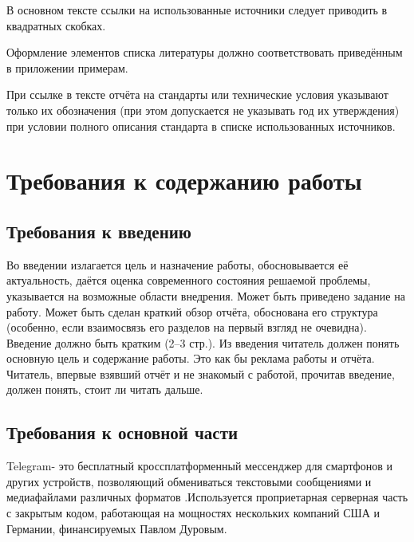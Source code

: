 \documentclass[utf8,12pt, coursreport]{G7-32}
\begin{document}
В основном тексте ссылки на использованные источники следует приводить в квадратных скобках.

Оформление элементов списка литературы должно соответствовать приведённым в приложении примерам.

При ссылке в тексте отчёта на стандарты или технические условия указывают только их обозначения (при этом допускается не указывать год их утверждения) при условии полного описания стандарта в списке использованных источников.




\chapter{Требования к содержанию работы}

\section{Требования к введению}

Во введении излагается цель и назначение работы, обосновывается её актуальность, даётся оценка современного состояния решаемой проблемы, указывается на возможные области внедрения. Может быть приведено задание на работу. Может быть сделан краткий обзор отчёта, обоснована его структура (особенно, если взаимосвязь его разделов на первый взгляд не очевидна). Введение должно быть кратким (2--3 стр.). Из введения читатель должен понять основную цель и содержание работы. Это как бы реклама работы и отчёта. Читатель, впервые взявший отчёт и не знакомый с работой, прочитав введение, должен понять, стоит ли читать дальше.

\section{Требования к основной части}


Telegram- это бесплатный кроссплатформенный мессенджер для смартфонов и других устройств, позволяющий обмениваться текстовыми сообщениями и медиафайлами различных форматов .Используется проприетарная серверная часть с закрытым кодом, работающая на мощностях нескольких компаний США и Германии, финансируемых Павлом Дуровым.
\end{document}

